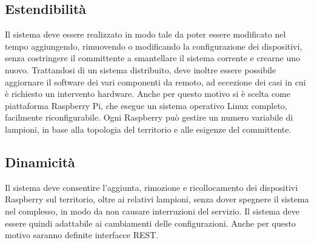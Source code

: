 \subsection{Estendibilità}
Il sistema deve essere realizzato in modo tale da poter essere modificato nel tempo aggiungendo, rimuovendo o modificando la configurazione dei dispositivi, senza costringere il committente a smantellare il sistema corrente e crearne uno nuovo. Trattandosi di un sistema distribuito, deve inoltre essere possibile aggiornare il software dei vari componenti da remoto, ad eccezione dei casi in cui è richiesto un intervento hardware. Anche per questo motivo si è scelta come piattaforma Raspberry Pi, che esegue un sistema operativo Linux completo, facilmente riconfigurabile. Ogni Raspberry può gestire un numero variabile di lampioni, in base alla topologia del territorio e alle esigenze del committente.
\subsection{Dinamicità}
Il sistema deve consentire l'aggiunta, rimozione e ricollocamento dei dispositivi Raspberry sul territorio, oltre ai relativi lampioni, senza dover spegnere il sistema nel complesso, in modo da non causare interruzioni del servizio. Il sistema deve essere quindi adattabile ai cambiamenti delle configurazioni. Anche per questo motivo saranno definite interfacce REST.
